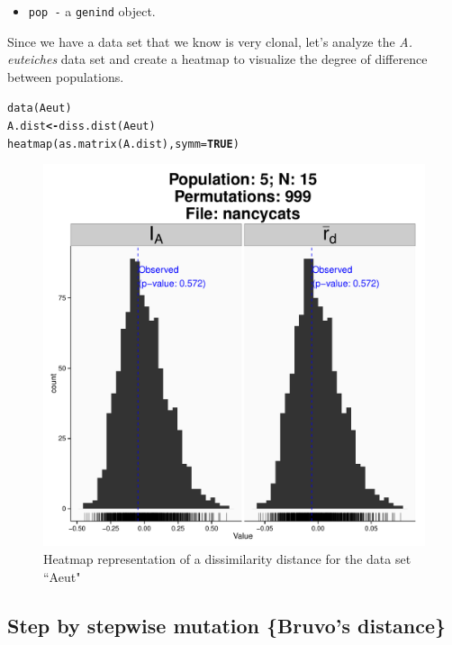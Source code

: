 \documentclass[letterpaper]{article}\usepackage[]{graphicx}\usepackage[]{color}
\makeatletter
\newcommand{\hlnum}[1]{\textcolor[rgb]{0.502,0,0.502}{\textbf{#1}}}%
\newcommand{\hlstd}[1]{\textcolor[rgb]{0,0,0}{#1}}%
\newcommand{\hlkwb}[1]{\textcolor[rgb]{0.502,0.502,0.753}{\textbf{#1}}}%
\newcommand{\hlkwc}[1]{\textcolor[rgb]{0,0.502,0.753}{#1}}%
\newcommand{\hlkwd}[1]{\textcolor[rgb]{0,0.267,0.4}{#1}}%
\newenvironment{kframe}{%
 \def\at@end@of@kframe{}%
 \ifinner\ifhmode%
  \def\at@end@of@kframe{\end{minipage}}%
  \begin{minipage}{\columnwidth}%
 \fi\fi%
 \def\FrameCommand##1{\hskip\@totalleftmargin \hskip-\fboxsep
 \colorbox{shadecolor}{##1}\hskip-\fboxsep
     \hskip-\linewidth \hskip-\@totalleftmargin \hskip\columnwidth}%
 \MakeFramed {\advance\hsize-\width
   \@totalleftmargin\z@ \linewidth\hsize
   \@setminipage}}%
 {\par\unskip\endMakeFramed%
 \at@end@of@kframe}
\newenvironment{knitrout}{}{} %
\makeatother
\begin{document}
\begin{itemize}
  \item \texttt{pop -} a \texttt{genind} object. 
\end{itemize}
Since we have a data set that we know is very clonal, let's analyze the \textit{A. euteiches} data set \cite{Grunwald:2006} and create a heatmap to visualize the degree of difference between populations.
\begin{knitrout}\footnotesize
{}\color{fgcolor}\begin{kframe}
\begin{alltt}
\hlkwd{data}\hlstd{(Aeut)}
\hlstd{A.dist} \hlkwb{<-} \hlkwd{diss.dist}\hlstd{(Aeut)}
\hlkwd{heatmap}\hlstd{(}\hlkwd{as.matrix}\hlstd{(A.dist),} \hlkwc{symm} \hlstd{=} \hlnum{TRUE}\hlstd{)}
\end{alltt}
\end{kframe}
\end{knitrout}

\begin{figure}[h!]
  \centering
  \caption{\footnotesize Heatmap representation of a dissimilarity distance for the data set ``Aeut"}
  \label{diss_heat_map}
\begin{knitrout}\footnotesize
{}\color{fgcolor}

{\centering \includegraphics[width=0.5\linewidth]{figure/unnamed-chunk-7} 

}



\end{knitrout}

\end{figure}
\newpage
%
\subsection{Step by stepwise mutation \{Bruvo's distance\}}
\label{index:bruvo}
\end{document}
